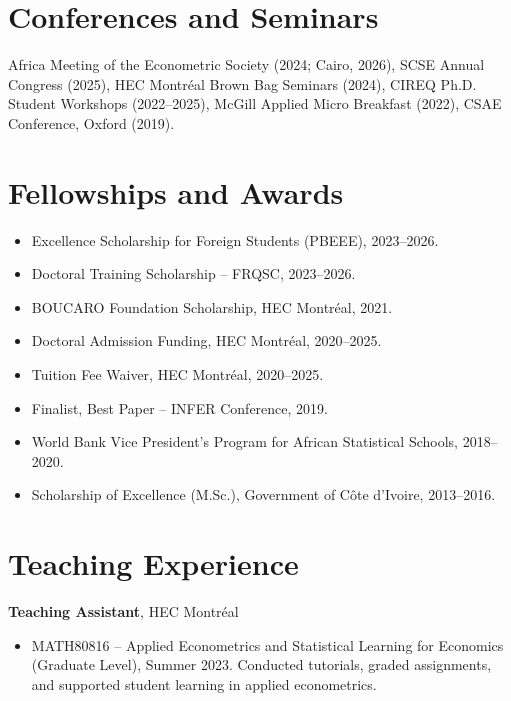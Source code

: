 \documentclass[11pt,letterpaper]{article}
\begin{document}
\section{Conferences and Seminars}

Africa Meeting of the Econometric Society (2024; Cairo, 2026), SCSE Annual Congress (2025),
HEC Montr\'eal Brown Bag Seminars (2024), CIREQ Ph.D. Student Workshops (2022--2025),
McGill Applied Micro Breakfast (2022), CSAE Conference, Oxford (2019).

\section{Fellowships and Awards}

\begin{itemize}
  \item Excellence Scholarship for Foreign Students (PBEEE), 2023--2026.
  \item Doctoral Training Scholarship -- FRQSC, 2023--2026.
  \item BOUCARO Foundation Scholarship, HEC Montr\'eal, 2021.
  \item Doctoral Admission Funding, HEC Montr\'eal, 2020--2025.
  \item Tuition Fee Waiver, HEC Montr\'eal, 2020--2025.
  \item Finalist, Best Paper -- INFER Conference, 2019.
  \item World Bank Vice President's Program for African Statistical Schools, 2018--2020.
  \item Scholarship of Excellence (M.Sc.), Government of C\^ote d'Ivoire, 2013--2016.
\end{itemize}

\section{Teaching Experience}

\textbf{Teaching Assistant}, HEC Montr\'eal
\begin{itemize}
  \item MATH80816 -- Applied Econometrics and Statistical Learning for Economics (Graduate Level), Summer 2023. Conducted tutorials, graded assignments, and supported student learning in applied econometrics.
\end{itemize}
\end{document}
